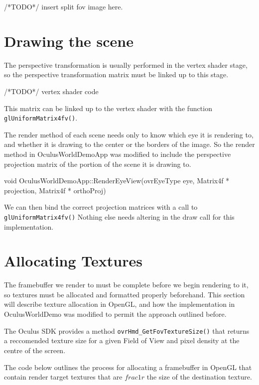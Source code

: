 \documentclass[12pt,a4paper,twoside,openright]{report}
\begin{document}
/*TODO*/ insert split fov image here. 

\section{Drawing the scene}

The perspective transformation is usually performed in the vertex shader stage, so the perspective transformation matrix must be linked up to this stage.

\begin{blockcode}
/*TODO*/ vertex shader code
\end{blockcode} 
This matrix can be linked up to the vertex shader with the function \texttt{glUniformMatrix4fv()}.


The render method of each scene needs only to know which eye it is rendering to, and whether it is drawing to the center or the borders of the image. 
So the render method in OculusWorldDemoApp was modified to include the perspective projection matrix of the portion of the scene it is drawing to.

\begin{blockcode}[commandchars=\\\{\}]
void OculusWorldDemoApp::RenderEyeView(ovrEyeType eye,
                                       \color{green}Matrix4f * projection,
                                       \color{green}Matrix4f * orthoProj)
\end{blockcode}

We can then bind the correct projection matrices with a call to \texttt{glUniformMatrix4fv()}
Nothing else needs altering in the draw call for this implementation.


\section{Allocating Textures}

The framebuffer we render to must be complete before we begin rendering to it, so textures must be allocated and formatted properly beforehand. This section will describe texture allocation in OpenGL, and how the implementation in OculusWorldDemo was modified to permit the approach outlined before. 
 
The Oculus SDK provides a method \texttt{ovrHmd\_GetFovTextureSize()} that returns a reccomended texture size for a given Field of View and pixel density at the centre of the screen.

The code below outlines the process for allocating a framebuffer in OpenGL that contain render target textures that are $frac{1}{r}$ the size of the destination texture.
\end{document}
